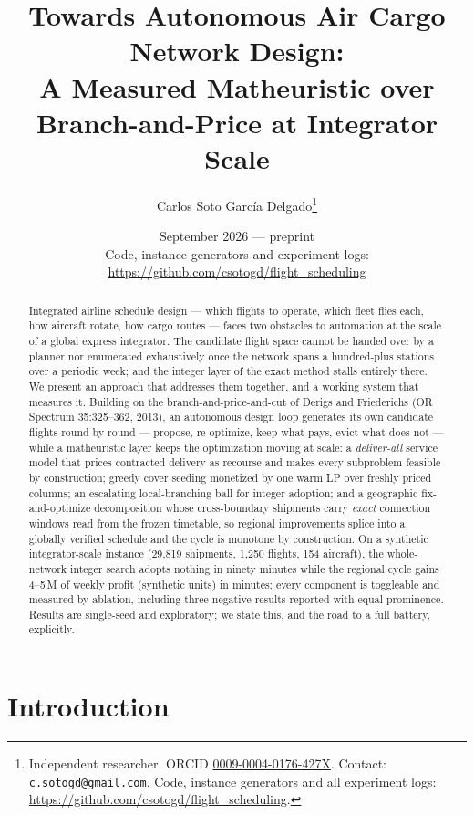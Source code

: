 \documentclass[11pt]{article}
\title{Towards Autonomous Air Cargo Network Design:\\
A Measured Matheuristic over Branch-and-Price at Integrator Scale}
\author{Carlos Soto Garc\'ia Delgado\thanks{Independent researcher.
ORCID \href{https://orcid.org/0009-0004-0176-427X}{0009-0004-0176-427X}.
Contact: \texttt{c.sotogd@gmail.com}. Code, instance generators and all
experiment logs: \url{https://github.com/csotogd/flight_scheduling}.}}
\date{September 2026 --- preprint\\[6pt]
{\normalsize Code, instance generators and experiment logs:
\url{https://github.com/csotogd/flight_scheduling}}}
\begin{document}
\maketitle

\begin{abstract}
Integrated airline schedule design --- which flights to operate, which fleet
flies each, how aircraft rotate, how cargo routes --- faces two obstacles to
automation at the scale of a global express integrator. The candidate flight
space cannot be handed over by a planner nor enumerated exhaustively once the
network spans a hundred-plus stations over a periodic week; and the integer
layer of the exact method stalls entirely there. We present an approach that addresses them together, and a
working system that measures it. Building on the branch-and-price-and-cut
of Derigs and Friederichs (OR Spectrum 35:325--362, 2013), an autonomous
design loop generates its own candidate flights round by round --- propose,
re-optimize, keep what pays, evict what does not --- while a matheuristic
layer keeps the optimization moving at scale: a \emph{deliver-all} service
model that prices contracted delivery as recourse and makes every
subproblem feasible by construction; greedy cover seeding monetized by one
warm LP over freshly priced columns; an escalating local-branching ball for
integer adoption; and a geographic fix-and-optimize decomposition whose
cross-boundary shipments carry \emph{exact} connection windows read from
the frozen timetable, so regional improvements splice into a globally
verified schedule and the cycle is monotone by construction. On a synthetic
integrator-scale instance (29{,}819 shipments, 1{,}250 flights, 154
aircraft), the whole-network integer search adopts nothing in ninety
minutes while the regional cycle gains 4--5\,M of weekly profit (synthetic
units) in minutes; every component is toggleable and measured by ablation,
including three negative results reported with equal prominence. Results
are single-seed and exploratory; we state this, and the road to a full
battery, explicitly.
\end{abstract}

\section{Introduction}
\end{document}
